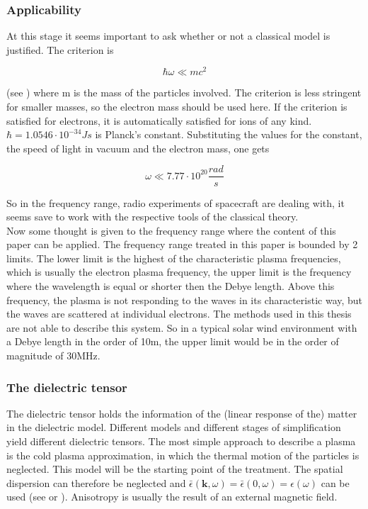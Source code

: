 \documentclass[draft,ras]{agutex}
\begin{document}
\begin{article}
\subsubsection{Applicability}
At this stage it seems important to ask whether or not a classical model is justified. The criterion is

\begin{equation}
    \hbar \omega \ll m c^2
\end{equation}

(see \cite{melrose1}) where m is the mass of the particles involved. The criterion is less stringent for smaller masses, so the electron mass should be used here. If the criterion is satisfied for electrons, it is automatically satisfied for ions of any kind. $\hbar=1.0546 \cdot 10^{-34} Js $ is Planck's constant. Substituting the values for the constant, the speed of light in vacuum and the electron mass, one gets

\begin{equation}
    \omega \ll 7.77 \cdot 10^{20} \frac{rad}{s}
\end{equation}

So in the frequency range, radio experiments of spacecraft are dealing with, it seems save to work with the respective tools of the classical theory.\\

Now some thought is given to the frequency range where the content of this paper can be applied. The frequency range treated in this paper is bounded by 2 limits. The lower limit is the highest of the characteristic plasma frequencies,
which is usually the electron plasma frequency, the upper limit is the frequency where the wavelength is equal or shorter then the Debye
length. Above this frequency, the plasma is not responding to the waves in its characteristic way, but the waves are scattered at individual electrons. The methods used in this thesis are not able to describe this system. So in a typical solar wind environment with a Debye length in the order of 10m, the upper limit would be in the order of magnitude of 30MHz.


\subsubsection{The dielectric tensor}
The dielectric tensor holds the information of the (linear response of the) matter in the dielectric model. Different models and different stages of simplification yield different dielectric tensors. The most simple approach to describe a plasma is the cold plasma approximation, in which the thermal motion of the particles is neglected. This model will be the starting point of the treatment. The spatial dispersion can therefore be neglected and $\bar{\epsilon}(\mathbf{k},\omega)=\bar{\epsilon}(0,\omega)=\epsilon(\omega)$ can be used (see \cite{ginzburg} or \cite{stix}). Anisotropy is usually the result of an external magnetic field.\\


\end{article}
\end{document}
